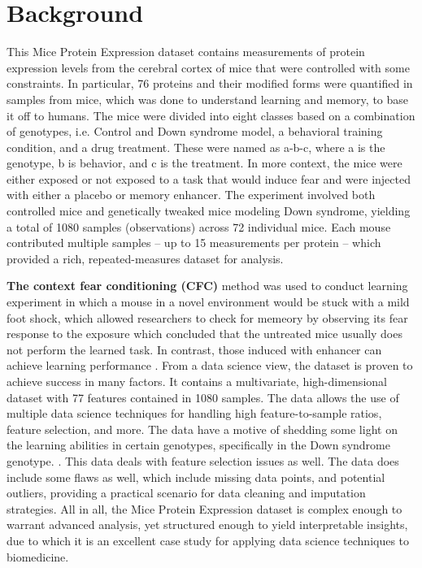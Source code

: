 \documentclass[a4paper,12pt]{article}
\begin{document}
\newpage

\section{Background}
This Mice Protein Expression dataset contains measurements of protein expression levels from the cerebral cortex of mice that were controlled with some constraints. In particular, 76 proteins and their modified forms were quantified in samples from mice, which was done to understand learning and memory, to base it off to humans. \cite{higuera2015mice} The mice were divided into eight classes based on a combination of genotypes, i.e. Control and Down syndrome model, a behavioral training condition, and a drug treatment. These were named as a-b-c, where a is the genotype, b is behavior, and c is the treatment. In more context, the mice were either exposed or not exposed to a task that would induce fear and were injected with either a placebo or memory enhancer\cite{higuera2015mice}.
\newline The experiment involved both controlled mice and genetically tweaked mice modeling Down syndrome, yielding a total of 1080 samples (observations) across 72 individual mice\cite{higuera2015mice}. Each mouse contributed multiple samples – up to 15 measurements per protein – which provided a rich, repeated-measures dataset for analysis. \cite{higuera2015mice}
\newline

\textbf{The context fear conditioning (CFC)} method was used to conduct learning experiment in which a mouse in a novel environment would be stuck with a mild foot shock, which allowed researchers to check for memeory by observing its fear response to the exposure which concluded that the untreated mice usually does not perform the learned task. In contrast, those induced with enhancer can achieve learning performance \cite{higuera2015self}.
\newline
From a data science view, the dataset is proven to achieve success in many factors. It contains a multivariate, high-dimensional dataset with 77 features contained in 1080 samples. The data allows the use of multiple data science techniques for handling high feature-to-sample ratios, feature selection, and more. The data have a motive of shedding some light on the learning abilities in certain genotypes, specifically in the Down syndrome genotype. \cite{higuera2015mice}. This data deals with feature selection issues as well. \cite{higuera2015mice}
\newline
 The data does include some flaws as well, which include missing data points, and potential outliers, providing a practical scenario for data cleaning and imputation strategies. 
 \newline
 All in all, the Mice Protein Expression dataset is complex enough to warrant advanced analysis, yet structured enough to yield interpretable insights, due to which it is an excellent case study for applying data science techniques to biomedicine.
\end{document}
